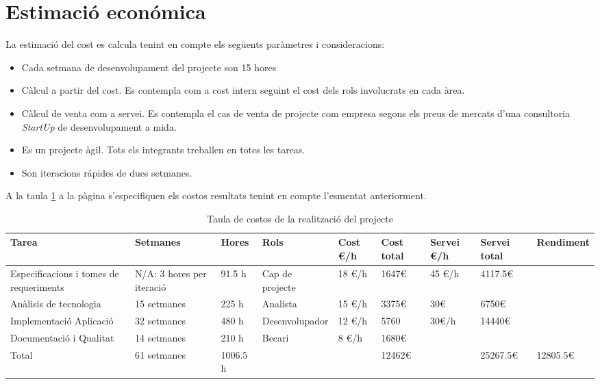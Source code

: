 \section{Estimaci\'{o} econ\'{o}mica}
La estimació del cost es calcula tenint en compte els següents paràmetres i consideracions:
\begin{itemize}
\item Cada setmana de desenvolupament del projecte son 15 hores
\item C\`{a}lcul a partir del cost. Es contempla com a cost intern seguint el cost dels rols involucrats en cada àrea.
\item C\`{a}lcul de venta com a servei. Es contempla el cas de venta de projecte com empresa segons els preus de mercats d'una consultoria \textit{StartUp} de desenvolupament a mida.
\item Es un projecte àgil. Tots els integrants treballen en totes les tareas.
\item Son iteracions r\'{a}pides de dues setmanes.
\end{itemize}

A la taula \ref{costs} a la p\`{a}gina \pageref{costs} s'especifiquen els costos resultats tenint en compte l'esmentat anteriorment.

\begin{table}
\begin{tabular}{|p{2.75cm}|p{2cm}|p{1cm}|p{3cm}|p{1cm}|p{2cm}|p{2cm}|p{2cm}|p{1.75cm}|}
\hline
Tarea & Setmanes & Hores & Rols & Cost \euro/h & Cost total & Servei \euro/h & Servei total & Rendiment \\ \hline
Especificacions i tomes de requeriments & N/A: 3 hores per iteració & 91.5 h & Cap de projecte & 18 \euro/h & 1647\euro & 45 \euro/h & 4117.5\euro & \\ \hline
Anàlisis de tecnologia & 15 setmanes & 225 h & Analista & 15 \euro/h & 3375\euro & 30\euro & 6750\euro & \\ \hline
Implementació Aplicació & 32 setmanes & 480 h & Desenvolupador & 12 \euro/h & 5760 & 30\euro/h & 14440\euro & \\ \hline
Documentació i Qualitat & 14 setmanes & 210 h & Becari & 8 \euro/h & 1680\euro & & & \\ \hline 
\hline
Total & 61 setmanes & 1006.5 h & & & 12462\euro & & 25267.5\euro & 12805.5\euro \\ \hline
\end{tabular}
\caption{Taula de costos de la realització del projecte}
\label{costs}
\end{table}



